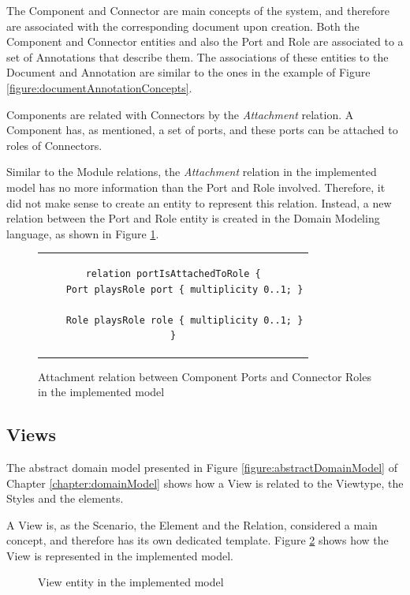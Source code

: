 The Component and Connector are main concepts of the system, and therefore are associated with the corresponding document upon creation. Both the Component and Connector entities and also the Port and Role are associated to a set of Annotations that describe them. The associations of these entities to the Document and Annotation are similar to the ones in the example of Figure \ref{figure:documentAnnotationConcepts}.

Components are related with Connectors by the \textit{Attachment} relation. A Component has, as mentioned, a set of ports, and these ports can be attached to roles of Connectors.

Similar to the Module relations, the \textit{Attachment} relation in the implemented model has no more information than the Port and Role involved. Therefore, it did not make sense to create an entity to represent this relation. Instead, a new relation between the Port and Role entity is created in the Domain Modeling language, as shown in Figure \ref{figure:modelAttachmentRelation}.

\begin{figure}[h]
\centering
\lstset{style=customjava}
\begin{tabular}{c}
\begin{lstlisting}
relation portIsAttachedToRole {
	Port playsRole port { multiplicity 0..1; }
	
	Role playsRole role { multiplicity 0..1; }
}
\end{lstlisting}
\end{tabular}
\caption{Attachment relation between Component Ports and Connector Roles in the implemented model}
\label{figure:modelAttachmentRelation}
\end{figure}


\subsection{Views}
\label{subsection:modelViews}

The abstract domain model presented in Figure \ref{figure:abstractDomainModel} of Chapter \ref{chapter:domainModel} shows how a View is related to the Viewtype, the Styles and the elements. 

A View is, as the Scenario, the Element and the Relation, considered a main concept, and therefore has its own dedicated template. Figure \ref{figure:modelView} shows how the View is represented in the implemented model.

\begin{figure}[h]
\centering
\renewcommand {\umltextcolor}{black}
\renewcommand {\umlfillcolor}{none}
\renewcommand {\umldrawcolor}{black}
\caption{View entity in the implemented model}
\label{figure:modelView}
\end{figure}

